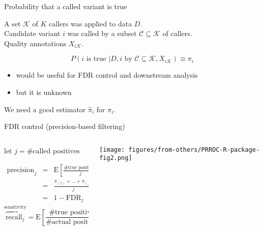 \documentclass{beamer} %
\begin{document}
\begin{frame}{Probability that a called variant is true}

A set \(\mathcal{K}\) of \(K\) callers was applied to data \(D\).\\
Candidate variant \(i\) was called by a subset \(\mathcal{C}\subseteq\mathcal{K}\)
of callers. \\
Quality annotations \(X_{i\mathcal{K}}\).

\[
P(i \text{ is true } | D, i \text{ by }
\mathcal{C}\subseteq\mathcal{K}, X_{i\mathcal{K}}) \equiv \pi_{i}
\]
\begin{itemize}
\item would be useful for FDR control and downstream analysis
\item but it is unknown
\end{itemize}

\bigskip
{
\begin{center}
\Large We need a good estimator \(\hat{\pi}_{i}\) for \(\pi_{i}\).
\end{center}
}
\end{frame}

\begin{frame}{FDR control (precision-based filtering)}
\begin{columns}[t]
\small
\begin{column}{0.45\textwidth}
\begin{center}
{let \(j = \text{\# called positives}\) }
\smallskip
\end{center}
\begin{eqnarray*}
\text{precision}_j &=& \text{E} \left[ \frac{\text{\# true positives}}{j} \right] \\
&=& \frac{\pi_{(1)} + ... + \pi_{(j)}}{j} \\
&=& 1 - \text{FDR}_j
\end{eqnarray*}
\smallskip
\[
\overbrace{\text{recall}_j}^{\text{sensitivity}} = \text{E} \left[
\frac{\text{\# true positives}}{\text{\# actual positives}} \right]
\]
\end{column}
\begin{column}{0.6\textwidth}

\texttt{[image: figures/from-others/PRROC-R-package-fig2.png]}
\end{column}
\end{columns}
\end{frame}
\end{document}
